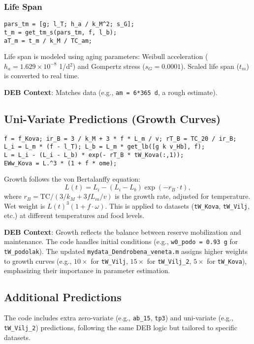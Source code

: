\documentclass[11pt]{article}
\begin{document}
\subsubsection{Life Span}
\begin{verbatim}
pars_tm = [g; l_T; h_a / k_M^2; s_G];
t_m = get_tm_s(pars_tm, f, l_b);
aT_m = t_m / k_M / TC_am;
\end{verbatim}
Life span is modeled using aging parameters: Weibull acceleration ($h_a = 1.629 \times 10^{-8}$ 1/d$^2$) and Gompertz stress ($s_G = 0.0001$). Scaled life span ($t_m$) is converted to real time.

\textbf{DEB Context}: Matches data (e.g., \texttt{am = 6*365 d}, a rough estimate).

\subsection{Uni-Variate Predictions (Growth Curves)}
\begin{verbatim}
f = f_Kova; ir_B = 3 / k_M + 3 * f * L_m / v; rT_B = TC_20 / ir_B;
L_i = L_m * (f - l_T); L_b = L_m * get_lb([g k v_Hb], f);
L = L_i - (L_i - L_b) * exp(- rT_B * tW_Kova(:,1));
EWw_Kova = L.^3 * (1 + f * ome);
\end{verbatim}
Growth follows the von Bertalanffy equation:
\begin{equation}
L(t) = L_i - (L_i - L_b) \exp(-r_B \cdot t),
\end{equation}
where $r_B = \text{TC} / (3 / k_M + 3 f L_m / v)$ is the growth rate, adjusted for temperature. Wet weight is $L(t)^3 (1 + f \cdot \omega)$. This is applied to datasets (\texttt{tW\_Kova}, \texttt{tW\_Vilj}, etc.) at different temperatures and food levels.

\textbf{DEB Context}: Growth reflects the balance between reserve mobilization and maintenance. The code handles initial conditions (e.g., \texttt{w0\_podo = 0.93 g} for \texttt{tW\_podolak}). The updated \texttt{mydata\_Dendrobena\_veneta.m} assigns higher weights to growth curves (e.g., $10\times$ for \texttt{tW\_Vilj}, $15\times$ for \texttt{tW\_Vilj\_2}, $5\times$ for \texttt{tW\_Kova}), emphasizing their importance in parameter estimation.

\subsection{Additional Predictions}
The code includes extra zero-variate (e.g., \texttt{ab\_15}, \texttt{tp3}) and uni-variate (e.g., \texttt{tW\_Vilj\_2}) predictions, following the same DEB logic but tailored to specific datasets.
\end{document}
